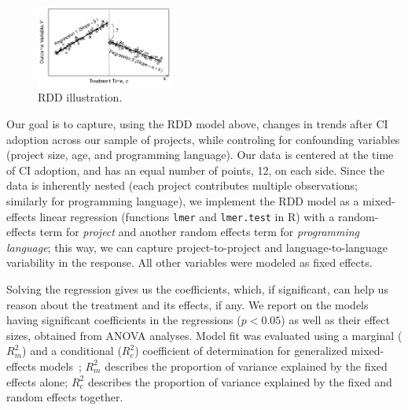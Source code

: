 \begin{figure}[t]
	\centering
	\includegraphics[width=0.4\textwidth, clip=false, trim=0 15 15 0]{figures/RDD_plot.pdf}
	\caption{RDD illustration.}
	\label{RDDIllustration}
\end{figure}

Our goal is to capture, using the RDD model above, changes in trends after CI 
adoption across our sample of projects, while controling for confounding variables 
(\eg project size, age, and programming language).
Our data is centered at the time of CI adoption, and has an equal number of points, 
12, on each side.
Since the data is inherently nested (each project contributes multiple observations; 
similarly for programming language), we implement the RDD model as a 
mixed-effects linear regression (functions \texttt{lmer} and \texttt{lmer.test} in R) 
with a random-effects term for \emph{project} and another random effects term 
for \emph{programming language}; this way, we can capture project-to-project and 
language-to-language variability in the response.
All other variables were modeled as fixed effects.

Solving the regression gives us the coefficients, which, if significant, can help 
us reason about the treatment and its effects, if any.
We report on the models having significant coefficients in the regressions 
($p < 0.05$) as well as their effect sizes, obtained from ANOVA analyses.
Model fit was evaluated using a marginal ($R^2_m$) and a conditional ($R^2_c$) 
coefficient of determination for generalized mixed-effects 
models~\cite{nakagawa2013general, johnson2014extension}; $R^2_m$ describes 
the proportion of variance explained by the fixed effects alone; $R^2_c$ describes 
the proportion of variance explained by the fixed and random effects together.


